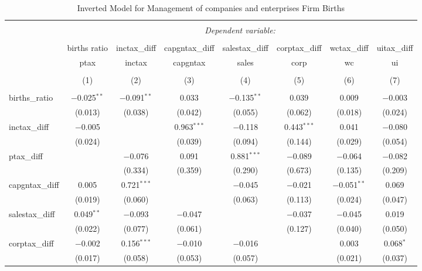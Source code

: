 
\begin{table}[!htbp] \centering 
  \caption{Inverted Model for  Management of companies and enterprises Firm Births} 
  \label{55rd} 
\footnotesize 
\begin{tabular}{@{\extracolsep{5pt}}lccccccc} 
\\[-1.8ex]\hline 
\hline \\[-1.8ex] 
 & \multicolumn{7}{c}{\textit{Dependent variable:}} \\ 
\cline{2-8} 
\\[-1.8ex] & births ratio & inctax\_diff & capgntax\_diff & salestax\_diff & corptax\_diff & wctax\_diff & uitax\_diff \\ 
 & ptax & inctax & capgntax & sales & corp & wc & ui \\ 
\\[-1.8ex] & (1) & (2) & (3) & (4) & (5) & (6) & (7)\\ 
\hline \\[-1.8ex] 
 births\_ratio & $-$0.025$^{**}$ & $-$0.091$^{**}$ & 0.033 & $-$0.135$^{**}$ & 0.039 & 0.009 & $-$0.003 \\ 
  & (0.013) & (0.038) & (0.042) & (0.055) & (0.062) & (0.018) & (0.024) \\ 
  inctax\_diff & $-$0.005 &  & 0.963$^{***}$ & $-$0.118 & 0.443$^{***}$ & 0.041 & $-$0.080 \\ 
  & (0.024) &  & (0.039) & (0.094) & (0.144) & (0.029) & (0.054) \\ 
  ptax\_diff &  & $-$0.076 & 0.091 & 0.881$^{***}$ & $-$0.089 & $-$0.064 & $-$0.082 \\ 
  &  & (0.334) & (0.359) & (0.290) & (0.673) & (0.135) & (0.209) \\ 
  capgntax\_diff & 0.005 & 0.721$^{***}$ &  & $-$0.045 & $-$0.021 & $-$0.051$^{**}$ & 0.069 \\ 
  & (0.019) & (0.060) &  & (0.063) & (0.113) & (0.024) & (0.047) \\ 
  salestax\_diff & 0.049$^{**}$ & $-$0.093 & $-$0.047 &  & $-$0.037 & $-$0.045 & 0.019 \\ 
  & (0.022) & (0.077) & (0.061) &  & (0.127) & (0.040) & (0.050) \\ 
  corptax\_diff & $-$0.002 & 0.156$^{***}$ & $-$0.010 & $-$0.016 &  & 0.003 & 0.068$^{*}$ \\ 
  & (0.017) & (0.058) & (0.053) & (0.057) &  & (0.021) & (0.037) \\ 

\end{tabular}
\end{table}
